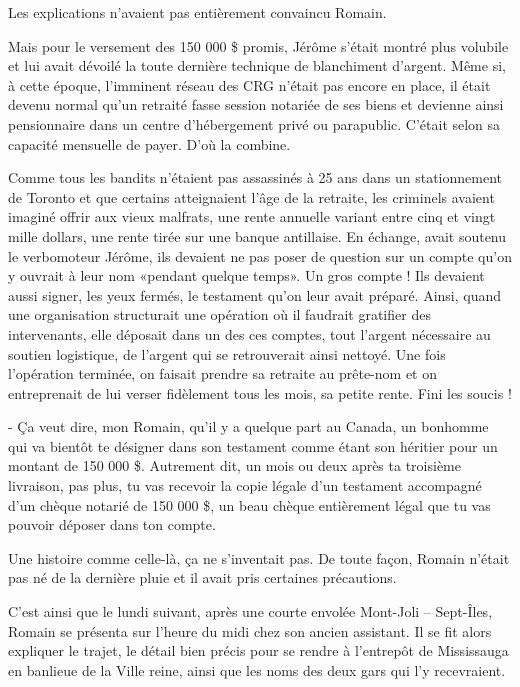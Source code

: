 Les explications n’avaient pas entièrement convaincu Romain.

Mais pour le versement des 150 000 \$ promis, Jérôme s’était montré plus volubile et lui avait dévoilé la toute dernière technique de blanchiment d’argent. Même si, à cette époque, l’imminent réseau des CRG n’était pas encore en place, il était devenu normal qu’un retraité fasse session notariée de ses biens et devienne ainsi pensionnaire dans un centre d’hébergement privé ou parapublic. C’était selon sa capacité mensuelle de payer. D’où la combine.

Comme tous les bandits n’étaient pas assassinés à 25 ans dans un stationnement de Toronto et que certains atteignaient l’âge de la retraite, les criminels avaient imaginé offrir aux vieux malfrats, une rente annuelle variant entre cinq et vingt mille dollars, une rente tirée sur une banque antillaise. En échange, avait soutenu le verbomoteur Jérôme, ils devaient ne pas poser de question sur un compte qu’on y ouvrait à leur nom «pendant quelque temps». Un gros compte ! Ils devaient aussi signer, les yeux fermés, le testament qu’on leur avait préparé. Ainsi, quand une organisation structurait une opération où il faudrait gratifier des intervenants, elle déposait dans un des ces comptes, tout l’argent nécessaire au soutien logistique, de l’argent qui se retrouverait ainsi nettoyé. Une fois l’opération terminée, on faisait prendre sa retraite au prête-nom et on entreprenait de lui verser fidèlement tous les mois, sa petite rente. Fini les soucis !

- Ça veut dire, mon Romain, qu’il y a quelque part au Canada, un bonhomme qui va bientôt te désigner dans son testament comme étant son héritier pour un montant de 150 000 \$. Autrement dit, un mois ou deux après ta troisième livraison, pas plus, tu vas recevoir la copie légale d’un testament accompagné d’un chèque notarié de 150 000 \$, un beau chèque entièrement légal que tu vas pouvoir déposer dans ton compte.

Une histoire comme celle-là, ça ne s’inventait pas. De toute façon, Romain n’était pas né de la dernière pluie et il avait pris certaines précautions.

C’est ainsi que le lundi suivant, après une courte envolée Mont-Joli – Sept-Îles, Romain se présenta sur l’heure du midi chez son ancien assistant. Il se fit alors expliquer le trajet, le détail bien précis pour se rendre à l’entrepôt de Mississauga en banlieue de la Ville reine, ainsi que les noms des deux gars qui l’y recevraient.

